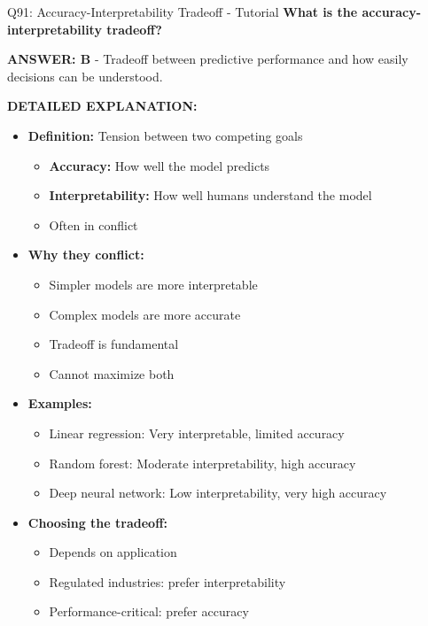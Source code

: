 \documentclass[8pt]{beamer}
\begin{document}
	\begin{frame}{Q91: Accuracy-Interpretability Tradeoff - Tutorial}
		\fontsize{6.5}{7.5}\selectfont
		\textbf{What is the accuracy-interpretability tradeoff?}
		
		\vspace{0.05cm}
		\textcolor{myblue}{\textbf{ANSWER: B}} - Tradeoff between predictive performance and how easily decisions can be understood.
		
		\vspace{0.05cm}
		\textbf{DETAILED EXPLANATION:}
		\begin{itemize}
			\item \textbf{Definition:} Tension between two competing goals
			\begin{itemize}
				\item \textbf{Accuracy:} How well the model predicts
				\item \textbf{Interpretability:} How well humans understand the model
				\item Often in conflict
			\end{itemize}
			\item \textbf{Why they conflict:}
			\begin{itemize}
				\item Simpler models are more interpretable
				\item Complex models are more accurate
				\item Tradeoff is fundamental
				\item Cannot maximize both
			\end{itemize}
			\item \textbf{Examples:}
			\begin{itemize}
				\item Linear regression: Very interpretable, limited accuracy
				\item Random forest: Moderate interpretability, high accuracy
				\item Deep neural network: Low interpretability, very high accuracy
			\end{itemize}
			\item \textbf{Choosing the tradeoff:}
			\begin{itemize}
				\item Depends on application
				\item Regulated industries: prefer interpretability
				\item Performance-critical: prefer accuracy
			\end{itemize}
		\end{itemize}
		

\end{frame}
\end{document}
